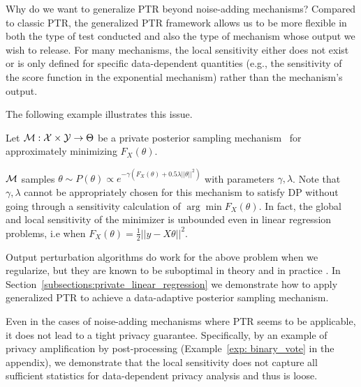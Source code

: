 Why do we want to generalize PTR beyond noise-adding mechanisms? Compared to classic PTR, the generalized PTR framework allows us to be more flexible in both the type of test conducted and also the type of mechanism whose output we wish to release. For many mechanisms, the local sensitivity either does not exist or is only defined for specific data-dependent quantities (e.g., the sensitivity of the score function in the exponential mechanism) rather than the mechanism's output. 

The following example illustrates this issue.

\begin{example}\label{exp: posterior}
Let $\mathcal{M}: \mathcal{X}\times \mathcal{Y} \to \Theta $ be a private posterior sampling   mechanism~\citep{minami2016differential,wang2015privacy,gopi2022private} for approximately minimizing $F_{X}(\theta)$.

$\mathcal{M}$ samples $\theta \sim P(\theta)\propto e^{-\gamma(F_X(\theta)+ 0.5\lambda ||\theta||^2)}$ with parameters $\gamma, \lambda$. Note that $\gamma,\lambda$ cannot be appropriately chosen for this mechanism to satisfy DP without going through a sensitivity calculation of $\arg\min F_X(\theta)$. In fact, the global and local sensitivity of the minimizer is unbounded even in linear regression problems, i.e when $F_X(\theta) = \frac{1}{2}||y-X\theta||^2.$ 

\end{example}
Output perturbation algorithms do work for the above problem when we regularize, but they are known to be suboptimal in theory and in practice \citep{chaudhuri2011differentially}. In Section~\ref{subsections:private_linear_regression} we demonstrate how to apply generalized PTR to achieve a data-adaptive posterior sampling mechanism.

Even in the cases of noise-adding mechanisms where PTR seems to be applicable, it does not lead to a tight privacy guarantee. Specifically, by an example of privacy amplification by post-processing (Example~\ref{exp: binary_vote} in the appendix), we demonstrate that the local sensitivity does not capture all sufficient statistics for data-dependent privacy analysis and thus is loose.


